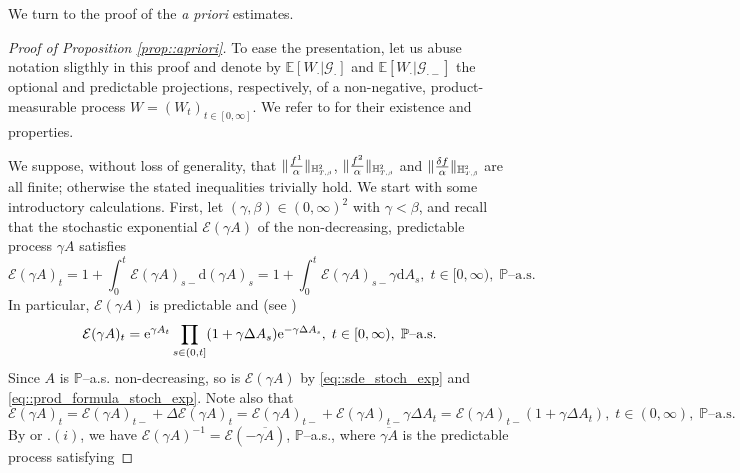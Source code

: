 \documentclass[10pt]{article} %
\newcommand\cE{\mathcal E}
\newcommand\cG{\mathcal G}
\newcommand{\smalltext}[1]{\text{\fontsize{4}{4}\selectfont$#1$}}
\def \E{\mathbb{E}}
\def \H{\mathbb{H}}
\def \P{\mathbb{P}}
\newcommand{\1}{\mathbf{1}}
\def\d{\mathrm{d}}
\begin{document}
\medskip
We turn to the proof of the \emph{a priori} estimates.

\begin{proof}[Proof of Proposition \ref{prop::apriori}]\label{proof::apriori}
	To ease the presentation, let us abuse notation sligthly in this proof and denote by $\E[W_\cdot|\cG_\cdot]$ and $\E[W_\cdot|\cG_{\cdot-}]$ the optional and predictable projections, respectively, of a non-negative, product-measurable process $W = (W_t)_{t \in [0,\infty]}$. We refer to \cite[Section VI.2 and Appendix I]{dellacherie1982probabilities} for their existence and properties.
	
	\medskip
	We suppose, without loss of generality, that $\| \frac{f^1}{\alpha}\|_{\H^{\smalltext{2}}_{\smalltext{T}\smalltext{,}\smalltext{\beta}}}$, $\| \frac{f^2}{\alpha}\|_{\H^{\smalltext{2}}_{\smalltext{T}\smalltext{,}\smalltext{\beta}}}$ and $\| \frac{\delta f}{\alpha}\|_{\H^{\smalltext{2}}_{\smalltext{T}\smalltext{,}\smalltext{\beta}}}$ are all finite; otherwise the stated inequalities trivially hold. We start with some introductory calculations. First, let $(\gamma,\beta) \in (0,\infty)^2$ with $\gamma < \beta$, and recall that the stochastic exponential $\cE(\gamma A)$ of the non-decreasing, predictable process $\gamma A$ satisfies
\begin{equation}\label{eq::sde_stoch_exp}
	\cE(\gamma A)_t = 1 + \int_0^t \cE(\gamma A)_{s-}  \d (\gamma A)_s = 1 + \int_0^t \cE(\gamma A)_{s-} \gamma \d A_s, \; t \in [0,\infty), \; \text{$\P$--a.s.}
\end{equation}
In particular, $\cE(\gamma A)$ is predictable and (see \cite[page 134]{jacod2003limit})
\begin{equation}\label{eq::prod_formula_stoch_exp}
	\displaystyle \cE(\gamma A)_t = \mathrm{e}^{\gamma A_t} \prod_{s \in (0,t]}(1+\gamma\Delta A_s)\mathrm{e}^{-\gamma\Delta A_\smalltext{s}}, \; t \in [0,\infty), \; \text{$\P$--a.s.}
\end{equation}
Since $A$ is $\P$--a.s. non-decreasing, so is $\cE(\gamma A)$ by \eqref{eq::sde_stoch_exp} and \eqref{eq::prod_formula_stoch_exp}. Note also that
\begin{equation}\label{eq::jump_stoch_exp}
	\cE(\gamma A)_t = \cE(\gamma A)_{t-} + \Delta\cE(\gamma A)_t = \cE(\gamma A)_{t-} + \cE(\gamma A)_{t-}\gamma\Delta A_t = \cE(\gamma A)_{t-}(1+\gamma\Delta A_t), \; t \in (0,\infty), \; \text{$\P$--a.s.}
\end{equation}
By \cite[Lemma 4.4]{cohen2012existence} or .$(i)$, we have $\cE(\gamma A)^{-1} = \cE(-\overline{\gamma A})$, $\P$--a.s., where $\overline{\gamma A}$ is the predictable process satisfying

\end{proof}
\end{document}

